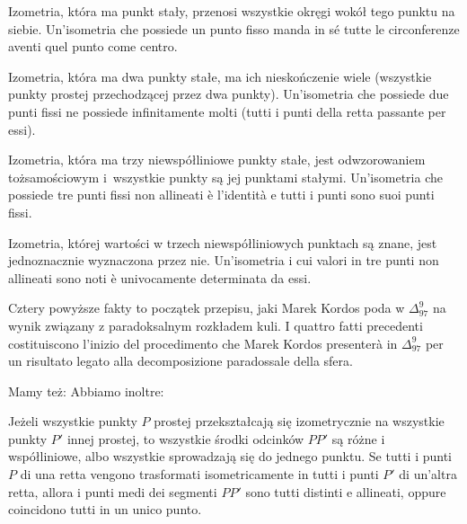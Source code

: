 \begin{proposition}
\label{delta_1997_9_start}%
    Izometria, która ma punkt stały, przenosi wszystkie okręgi wokół tego punktu na siebie. %
    Un'isometria che possiede un punto fisso manda in sé tutte le circonferenze aventi quel punto come centro. %
\end{proposition}

\begin{proposition}
    Izometria, która ma dwa punkty stałe, ma ich nieskończenie wiele (wszystkie punkty prostej przechodzącej przez dwa punkty). %
    Un'isometria che possiede due punti fissi ne possiede infinitamente molti (tutti i punti della retta passante per essi). %
\end{proposition}

\begin{proposition}
    Izometria, która ma trzy niewspółliniowe punkty stałe, jest odwzorowaniem tożsamościowym i~wszystkie punkty są jej punktami stałymi. %
    Un'isometria che possiede tre punti fissi non allineati è l'identità e tutti i punti sono suoi punti fissi. %
\end{proposition}

\begin{proposition}
\label{delta_1997_9_end}%
    Izometria, której wartości w trzech niewspółliniowych punktach są znane, jest jednoznacznie wyznaczona przez nie. %
    Un'isometria i cui valori in tre punti non allineati sono noti è univocamente determinata da essi. %
\end{proposition}

Cztery powyższe fakty to początek przepisu, jaki Marek Kordos poda w $\Delta_{97}^9$ na wynik związany z paradoksalnym rozkładem kuli. %
I quattro fatti precedenti costituiscono l'inizio del procedimento che Marek Kordos presenterà in $\Delta_{97}^9$ per un risultato legato alla decomposizione paradossale della sfera. %

Mamy też: %
Abbiamo inoltre: %

\begin{theorem}[Hjelmsleva]
\label{thm:hjelmslev}%
    Jeżeli wszystkie punkty $P$ prostej przekształcają się izometrycznie na wszystkie punkty $P'$ innej prostej, to wszystkie środki odcinków $PP'$ są różne i współliniowe, albo wszystkie sprowadzają się do jednego punktu. %
    Se tutti i punti $P$ di una retta vengono trasformati isometricamente in tutti i punti $P'$ di un'altra retta, allora i punti medi dei segmenti $PP'$ sono tutti distinti e allineati, oppure coincidono tutti in un unico punto. %
\end{theorem}

